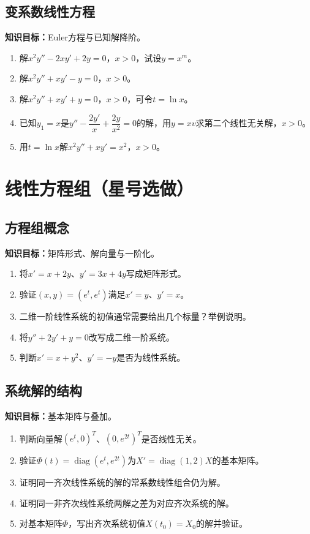 \documentclass[11pt,a4paper,fontset=fandol]{ctexrep}
\newcommand{\goal}[1]{\textbf{知识目标：}#1\par}
\begin{document}
\subsection{变系数线性方程}
\goal{Euler方程与已知解降阶。}
\begin{enumerate}
\item 解$x^2y''-2xy'+2y=0$，$x>0$，试设$y=x^m$。
\item 解$x^2y''+xy'-y=0$，$x>0$。
\item 解$x^2y''+xy'+y=0$，$x>0$，可令$t=\ln x$。
\item 已知$y_1=x$是$y''-\dfrac{2y'}{x}+\dfrac{2y}{x^2}=0$的解，用$y=xv$求第二个线性无关解，$x>0$。
\item 用$t=\ln x$解$x^2y''+xy'=x^2$，$x>0$。
\end{enumerate}
\section{线性方程组（星号选做）}
\subsection{方程组概念}
\goal{矩阵形式、解向量与一阶化。}
\begin{enumerate}
\item 将$x'=x+2y$、$y'=3x+4y$写成矩阵形式。
\item 验证$(x,y)=(e^t,e^t)$满足$x'=y$、$y'=x$。
\item 二维一阶线性系统的初值通常需要给出几个标量？举例说明。
\item 将$y''+2y'+y=0$改写成二维一阶系统。
\item 判断$x'=x+y^2$、$y'=-y$是否为线性系统。
\end{enumerate}
\subsection{系统解的结构}
\goal{基本矩阵与叠加。}
\begin{enumerate}
\item 判断向量解$(e^t,0)^T$、$(0,e^{2t})^T$是否线性无关。
\item 验证$\Phi(t)=\operatorname{diag}(e^t,e^{2t})$为$X'=\operatorname{diag}(1,2)X$的基本矩阵。
\item 证明同一齐次线性系统的解的常系数线性组合仍为解。
\item 证明同一非齐次线性系统两解之差为对应齐次系统的解。
\item 对基本矩阵$\Phi$，写出齐次系统初值$X(t_0)=X_0$的解并验证。
\end{enumerate}
\end{document}
